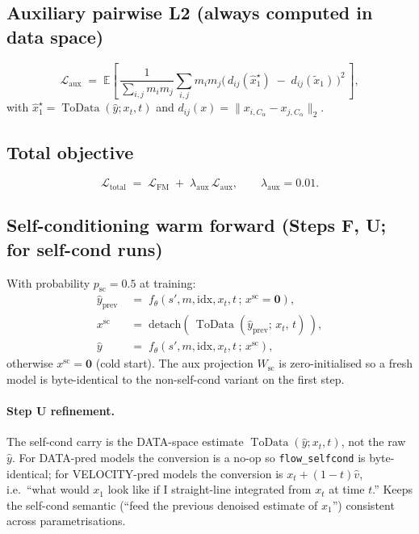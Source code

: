 \documentclass[11pt]{article}
\begin{document}
\subsection{Auxiliary pairwise L2 (always computed in data space)}
\begin{equation}
\mathcal{L}_{\text{aux}} \;=\; \mathbb{E}\!\left[\,\frac{1}{\sum_{i,j} m_i m_j}\!\sum_{i,j} m_i m_j \big(\,d_{ij}(\hat{x}_{1}^\star)\;-\;d_{ij}(\tilde x_1)\,\big)^2 \,\right],
\end{equation}
with $\hat{x}_{1}^\star = \operatorname{ToData}(\hat{y}; x_t, t)$ and $d_{ij}(x) = \|x_{i, C_\alpha} - x_{j, C_\alpha}\|_2$.

\subsection{Total objective}
\begin{equation}
\mathcal{L}_{\text{total}} \;=\; \mathcal{L}_{\text{FM}} \;+\; \lambda_{\text{aux}} \, \mathcal{L}_{\text{aux}}, \qquad \lambda_{\text{aux}} = 0.01.
\end{equation}

\subsection{Self-conditioning warm forward (Steps F, U; for self-cond runs)}
With probability $p_{\text{sc}} = 0.5$ at training:
\begin{align}
\hat{y}_{\text{prev}} &\;=\; f_\theta(s', m, \text{idx}, x_t, t \,;\, x^{\text{sc}} = \mathbf{0}), \\
x^{\text{sc}} &\;=\; \mathrm{detach}\!\left(\, \operatorname{ToData}(\hat{y}_{\text{prev}};\, x_t,\, t) \,\right), \\
\hat{y} &\;=\; f_\theta(s', m, \text{idx}, x_t, t \,;\, x^{\text{sc}}),
\end{align}
otherwise $x^{\text{sc}} = \mathbf{0}$ (cold start). The aux projection $W_{\text{sc}}$ is zero-initialised so a fresh model is byte-identical to the non-self-cond variant on the first step.

\paragraph{Step U refinement.} The self-cond carry is the DATA-space estimate $\operatorname{ToData}(\hat{y}; x_t, t)$, not the raw $\hat{y}$. For DATA-pred models the conversion is a no-op so \texttt{flow\_selfcond} is byte-identical; for VELOCITY-pred models the conversion is $x_t + (1-t)\hat{v}$, i.e.\ ``what would $x_1$ look like if I straight-line integrated from $x_t$ at time $t$.'' Keeps the self-cond semantic (``feed the previous denoised estimate of $x_1$'') consistent across parametrisations.
\end{document}
